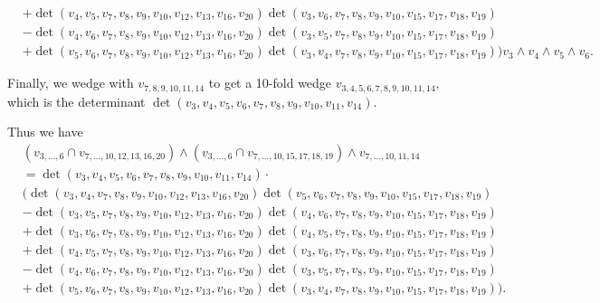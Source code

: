 \documentclass[ALCO, Unicode]{cedram}
\numberwithin{equation}{section}
\begin{document}
\begin{example}
{\begin{align*}
     &+ \det\left(v_{4},v_{5},v_{7}, v_{8}, v_{9}, v_{10}, v_{12}, v_{13}, v_{16}, v_{20}\right) \det\left(v_{3},v_{6},v_7,v_8,v_9,v_{10},v_{15}, v_{17}, v_{18}, v_{19}\right) \nonumber \\
     &- \det\left(v_{4},v_{6},v_{7}, v_{8}, v_{9}, v_{10}, v_{12}, v_{13}, v_{16}, v_{20}\right) \det\left(v_{3},v_{5},v_7,v_8,v_9,v_{10},v_{15}, v_{17}, v_{18}, v_{19}\right) \nonumber \\
     &+ \det\left(v_{5},v_{6},v_{7}, v_{8}, v_{9}, v_{10}, v_{12}, v_{13}, v_{16}, v_{20}\right) \det\left(v_{3},v_{4},v_7,v_8,v_9,v_{10},v_{15}, v_{17}, v_{18}, v_{19}\right) \Bigg)v_{3} \wedge v_{4} \wedge v_{5} \wedge v_{6}. \nonumber
\end{align*}
}

Finally, we wedge with $v_{7,8,9,10,11,14}$ to get  a 10-fold wedge $v_{3,4,5,6,7,8,9,10,11,14}$, which is the determinant $\det\left(v_3,v_4,v_5, v_6, v_7, v_8, v_9, v_{10}, v_{11}, v_{14}\right).$


Thus we have 
{\small
\begin{align}
&(v_{3,\dots,6}  \cap v_{7,\dots,10,12,13,16,20} ) \wedge 
\left(v_{3,\dots,6} \cap v_{7,\dots,10,15,17,18,19} \right) \wedge v_{7,\dots,10,11,14} \nonumber \\
 &= \det\left(v_3,v_4,v_5, v_6, v_7, v_8, v_9, v_{10},v_{11}, v_{14}\right) \cdot \nonumber \\
&\Bigg( \det\left(v_{3},v_{4}, v_{7}, v_{8}, v_{9}, v_{10}, v_{12}, v_{13}, v_{16}, v_{20}\right)  \det\left(v_{5},v_{6},v_7,v_8,v_9,v_{10},v_{15}, v_{17}, v_{18}, v_{19}\right) \nonumber \\
     &- \det\left(v_{3},v_{5},v_{7}, v_{8}, v_{9}, v_{10}, v_{12}, v_{13}, v_{16}, v_{20}\right) \det\left(v_{4},v_{6},v_7,v_8,v_9,v_{10},v_{15}, v_{17}, v_{18}, v_{19}\right) \nonumber \\
     &+ \det\left(v_{3},v_{6},v_{7}, v_{8}, v_{9}, v_{10}, v_{12}, v_{13}, v_{16}, v_{20}\right) \det\left(v_{4},v_{5},v_7,v_8,v_9,v_{10},v_{15}, v_{17}, v_{18}, v_{19}\right) \nonumber \\
     &+ \det\left(v_{4},v_{5},v_{7}, v_{8}, v_{9}, v_{10}, v_{12}, v_{13}, v_{16}, v_{20}\right) \det\left(v_{3},v_{6},v_7,v_8,v_9,v_{10},v_{15}, v_{17}, v_{18}, v_{19}\right) \nonumber \\
     &- \det\left(v_{4},v_{6},v_{7}, v_{8}, v_{9}, v_{10}, v_{12}, v_{13}, v_{16}, v_{20}\right) \det\left(v_{3},v_{5},v_7,v_8,v_9,v_{10},v_{15}, v_{17}, v_{18}, v_{19}\right) \nonumber \\
     &+ \det\left(v_{5},v_{6},v_{7}, v_{8}, v_{9}, v_{10}, v_{12}, v_{13}, v_{16}, v_{20}\right) \det\left(v_{3},v_{4},v_7,v_8,v_9,v_{10},v_{15}, v_{17}, v_{18}, v_{19}\right)\Bigg). \nonumber
\end{align}
}



\end{example}
\end{document}
